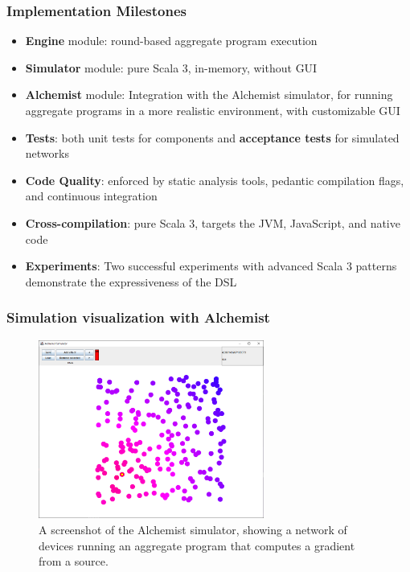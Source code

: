 \begin{frame}
    \frametitle{Implementation Milestones}
    \begin{itemize}
        \item \textbf{Engine} module: round-based aggregate program execution
        \item \textbf{Simulator} module: pure Scala 3, in-memory, without \ac{GUI}
        \item \textbf{Alchemist} module: Integration with the Alchemist simulator, for running aggregate programs in a more realistic environment, with customizable \ac{GUI}
        \item \textbf{Tests}: both unit tests for components and \textbf{acceptance tests} for simulated networks
        \item \textbf{Code Quality}: enforced by static analysis tools, pedantic compilation flags, and continuous integration
        \item \textbf{Cross-compilation}: pure Scala 3, targets the \ac{JVM}, JavaScript, and native code
        \item \textbf{Experiments}: Two successful experiments with advanced Scala 3 patterns demonstrate the expressiveness of the \ac{DSL}
    \end{itemize}
\end{frame}

\begin{frame}
    \frametitle{Simulation visualization with Alchemist}
    \begin{figure}
        \label{fig:alchemist-demo}
        \centering
        \includegraphics[width=0.66\textwidth]{figures/alchemist-demo.png}
        \caption{A screenshot of the Alchemist simulator, showing a network of devices running an aggregate program that computes a gradient from a source.}
    \end{figure}
\end{frame}

